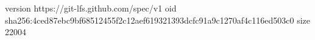 version https://git-lfs.github.com/spec/v1
oid sha256:4ced87ebc9bf68512455f2c12aef619321393dcfc91a9c1270af4c116ed503c0
size 22004
